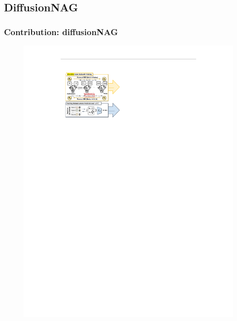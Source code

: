 \documentclass[aspectratio=169,xcolor=dvipsnames]{beamer}
\begin{document}
\subsection{DiffusionNAG}
\begin{frame}
    \frametitle{Contribution: diffusionNAG}
    \begin{figure}[htbp]
        \centering
        \includegraphics[height=.80\textheight]{diffusionNAG_part1.pdf}
    \end{figure}
\end{frame}
\end{document}
